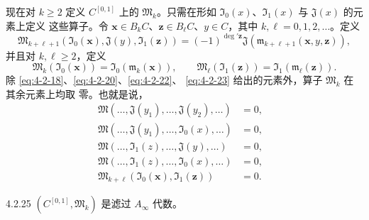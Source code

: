现在对 $k\geq2$ 定义 $C^{[0,1]}$ 上的 $\mathfrak M_k$。只需在形如
$\mathfrak I_0(x)$、$\mathfrak I_1(x)$ 与 $\mathfrak J(x)$ 的元素上定义
这些算子。令
$\mathbf x\in B_kC$、$\mathbf z\in B_\ell C$、$y\in C$，其中
$k,\ell=0,1,2,\ldots$。定义
\begin{equation}
 \mathfrak M_{k+\ell+1}
 (\mathfrak I_0(\mathbf x),\mathfrak J(y),\mathfrak I_1(\mathbf z))
 =(-1)^{\deg'\mathbf z}\mathfrak J
 (\mathfrak m_{k+\ell+1}(\mathbf x,y,\mathbf z)),
\tag{4.2.22}\label{eq:4-2-22}
\end{equation}
并且对 $k,\ell\geq2$，定义
\begin{equation}
 \mathfrak M_k(\mathfrak I_0(\mathbf x))
 =\mathfrak I_0(\mathfrak m_k(\mathbf x)),
 \qquad
 \mathfrak M_\ell(\mathfrak I_1(\mathbf z))
 =\mathfrak I_1(\mathfrak m_\ell(\mathbf z)).
\tag{4.2.23}\label{eq:4-2-23}
\end{equation}
除 \eqref{eq:4-2-18}、\eqref{eq:4-2-20}、\eqref{eq:4-2-22}、
\eqref{eq:4-2-23} 给出的元素外，算子 $\mathfrak M_k$ 在其余元素上均取
零。也就是说，
\begin{align}
 \mathfrak M(\ldots,\mathfrak J(y_1),\ldots,
   \mathfrak J(y_2),\ldots)&=0,
 &\tag{4.2.24.1}\label{eq:4-2-24-1}\\
 \mathfrak M(\ldots,\mathfrak J(y_1),\ldots,
   \mathfrak I_0(x),\ldots)&=0,
 &\tag{4.2.24.2}\label{eq:4-2-24-2}\\
 \mathfrak M(\ldots,\mathfrak I_1(z),\ldots,
   \mathfrak J(y),\ldots)&=0,
 &\tag{4.2.24.3}\label{eq:4-2-24-3}\\
 \mathfrak M(\ldots,\mathfrak I_1(z),\ldots,
   \mathfrak I_0(x),\ldots)&=0,
 &\tag{4.2.24.4}\label{eq:4-2-24-4}\\
 \mathfrak M_{k+\ell}(\mathfrak I_0(\mathbf x),
   \mathfrak I_1(\mathbf z))&=0.
 &\tag{4.2.24.5}\label{eq:4-2-24-5}
\end{align}

\begin{lemma}{4.2.25}\label{lem:4-2-25}
$(C^{[0,1]},\mathfrak M_k)$ 是滤过 $A_\infty$ 代数。
\end{lemma}

